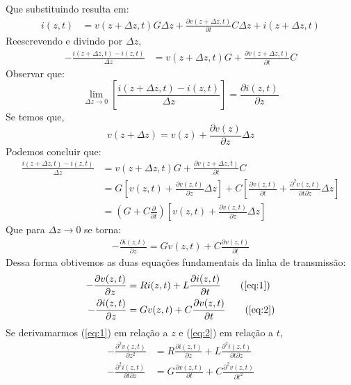 \documentclass[11pt,a4paper]{article}
\begin{document}
Que substituindo resulta em:
\begin{align*}
  i(z,t) &= v(z+\Delta z, t)G\Delta z + \frac{\partial v(z+\Delta z,t)}{\partial t} C \Delta z + i(z+ \Delta z, t)
\end{align*}
Reescrevendo e divindo por $\Delta z$, 
\begin{align*}
  -\frac{i(z+\Delta z,t)-i(z,t)}{\Delta z} &= v(z+\Delta z, t)G + \frac{\partial v(z+\Delta z, t)}{\partial t}C
\end{align*}
Observar que:
\begin{equation*}
  \lim_{ \Delta z \to 0} \left[ \frac{i(z+\Delta z,t) -i(z,t)}{\Delta z} \right] = \frac{ \partial i(z,t)}{\partial z}
\end{equation*}
Se temos que,
\begin{equation*}
  v(z+ \Delta z)  = v(z)+ \frac{\partial v (z)}{\partial z}\Delta z
\end{equation*}
Podemos concluir que:
\begin{align*}
  \frac{i(z+\Delta z,t) -i(z,t)}{\Delta z} &= v(z+\Delta z, t)G + \frac{\partial v(z+\Delta z,t)}{\partial t}C\\
  &= G \left[v(z,t) + \frac{\partial v(z,t)}{\partial z} \Delta z \right]+ C \left[ \frac{\partial v(z,t)}{\partial t} + \frac{\partial^2 v(z,t)}{\partial t \partial z}\Delta z \right] \\
  &= \left( G+C \frac{\partial}{\partial t}\right) \left[ v(z,t)+ \frac{ \partial v (z,t) }{\partial z} \Delta z \right]
\end{align*}
Que para $\Delta z \to 0$ se torna:
\begin{align}
  \label{eq:2}
  -\frac{\partial i(z,t)}{\partial z} = Gv(z,t)+ C \frac{\partial v(z,t)}{\partial t}
\end{align}
Dessa forma obtivemos as duas equações fundamentais da linha de transmissão:
\begin{align*}
  -\frac{\partial v(z,t)}{\partial z} &= Ri(z,t)+L\frac{\partial i(z,t)}{\partial t} \tag{\ref{eq:1}}\\
  -\frac{\partial i(z,t)}{\partial z} &= Gv(z,t)+ C \frac{\partial v(z,t)}{\partial t} \tag{\ref{eq:2}}
\end{align*}
Se derivamarmos (\ref{eq:1}) em relação a $z$ e (\ref{eq:2}) em relação a $t$,
\begin{align}
  -\frac{\partial^2 v(z,t)}{\partial z^2} &= R\frac{\partial i(z,t)}{\partial z}+L\frac{\partial^2 i(z,t)}{\partial t \partial z} \label{eq:3}\\
  -\frac{\partial^2 i(z,t)}{\partial t \partial z} &= G\frac{\partial v(z,t)}{\partial t}+ C \frac{\partial^2 v(z,t)}{\partial t^2} \label{eq:4}
\end{align}
\end{document}
